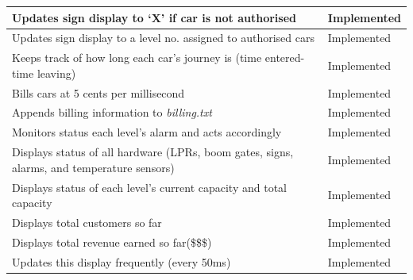 \documentclass[a4paper]{article}
\begin{document}
\begin{tabular}{|m{24.7em}|l|}
  \hline
  Updates sign display to ‘X’ if car is not authorised & \cellcolor{green!40}Implemented\\
  \hline
  Updates sign display to a level no. assigned to authorised cars & \cellcolor{green!40}Implemented\\
  \hline
  Keeps track of how long each car's journey is (time entered-time leaving) & \cellcolor{green!40}Implemented\\
  \hline
  Bills cars at 5 cents per millisecond & \cellcolor{green!40}Implemented\\
  \hline
  Appends billing information to \emph{billing.txt} & \cellcolor{green!40}Implemented\\
  \hline
  Monitors status each level’s alarm and acts accordingly & \cellcolor{green!40}Implemented\\
  \hline
  Displays status of all hardware (LPRs, boom gates, signs, alarms, and temperature sensors) & \cellcolor{green!40}Implemented\\
  \hline
  Displays status of each level’s current capacity and total capacity & \cellcolor{green!40}Implemented\\
  \hline
  Displays total customers so far & \cellcolor{green!40}Implemented\\
  \hline
  Displays total revenue earned so far(\$\$\$) & \cellcolor{green!40}Implemented\\
  \hline
  Updates this display frequently (every 50ms) & \cellcolor{green!40}Implemented\\
  \hline
\end{tabular}
\end{document}
